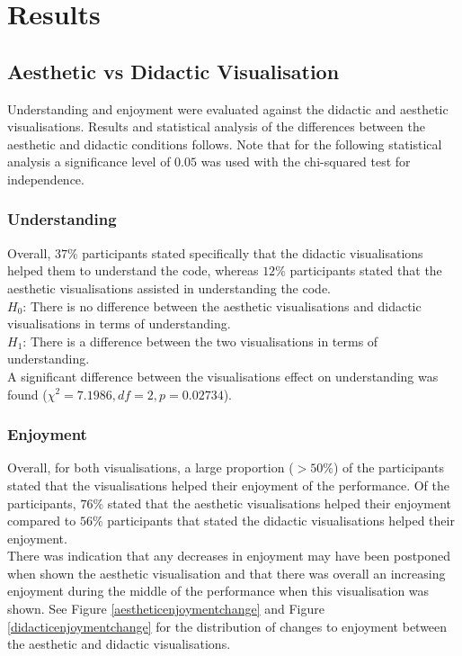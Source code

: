 \documentclass{article}
\begin{document}
\section{Results}

\subsection{Aesthetic vs Didactic Visualisation}

Understanding and enjoyment were evaluated against the didactic and aesthetic visualisations. Results and statistical analysis of the differences between the aesthetic and didactic conditions follows. Note that for the following statistical analysis a significance level of $0.05$ was used with the chi-squared test for independence.

\subsubsection{Understanding}
Overall, $37\%$ participants stated specifically that the didactic visualisations helped them to understand the code, whereas $12\%$ participants stated that the aesthetic visualisations assisted in understanding the code.\\

$H_0$: There is no difference between the aesthetic visualisations and didactic visualisations in terms of understanding.\\
$H_1$: There is a difference between the two visualisations in terms of understanding.\\

A significant difference between the visualisations effect on understanding was found ($\chi^2=7.1986,df=2,p=0.02734$).

\subsubsection{Enjoyment}
Overall, for both visualisations, a large proportion ($> 50\%$) of the participants stated that the visualisations helped their enjoyment of the performance. Of the participants, $76\%$ stated that the aesthetic visualisations helped their enjoyment compared to $56\%$ participants that stated the didactic visualisations helped their enjoyment.\\

There was indication that any decreases in enjoyment may have been postponed when shown the aesthetic visualisation and that there was overall an increasing enjoyment during the middle of the performance when this visualisation was shown. See Figure \ref{aestheticenjoymentchange} and Figure \ref{didacticenjoymentchange} for the distribution of changes to enjoyment between the aesthetic and didactic visualisations.\\
\end{document}

